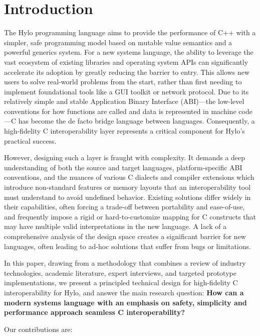\newpage
\section{Introduction}

The Hylo programming language aims to provide the performance of C++ with a simpler, safe programming model based on mutable value semantics and a powerful generics system. For a new systems language, the ability to leverage the vast ecosystem of existing libraries and operating system APIs can significantly accelerate its adoption by greatly reducing the barrier to entry. This allows new users to solve real-world problems from the start, rather than first needing to implement foundational tools like a GUI toolkit or network protocol. Due to its relatively simple and stable Application Binary Interface (ABI)—the low-level conventions for how functions are called and data is represented in machine code—C has become the de facto bridge language between languages. Consequently, a high-fidelity C interoperability layer represents a critical component for Hylo's practical success.

However, designing such a layer is fraught with complexity. It demands a deep understanding of both the source and target languages, platform-specific ABI conventions, and the nuances of various C dialects and compiler extensions which introduce non-standard features or memory layouts that an interoperability tool must understand to avoid undefined behavior. Existing solutions differ widely in their capabilities, often forcing a trade-off between portability and ease-of-use, and frequently impose a rigid or hard-to-customize mapping for C constructs that may have multiple valid interpretations in the new language. A lack of a comprehensive analysis of the design space creates a significant barrier for new languages, often leading to ad-hoc solutions that suffer from bugs or limitations.

In this paper, drawing from a methodology that combines a review of industry technologies, academic literature, expert interviews, and targeted prototype implementations, we present a principled technical design for high-fidelity C interoperability for Hylo, and answer the main research question: \textbf{How can a modern systems language with an emphasis on safety, simplicity and performance approach seamless C interoperability?}

Our contributions are:

